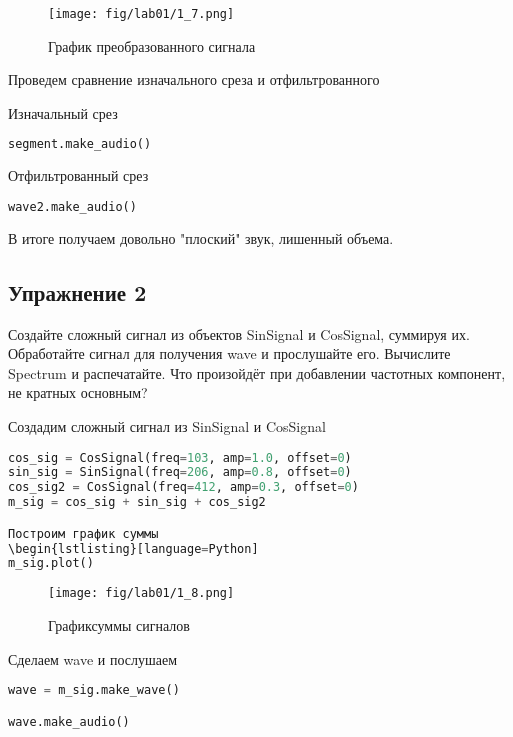 \begin{figure}[H]
	\begin{center}
		\texttt{[image: fig/lab01/1\_7.png]}
		\caption{График преобразованного сигнала}
	\end{center}
\end{figure}

Проведем сравнение изначального среза и отфильтрованного

Изначальный срез
\begin{lstlisting}[language=Python]
segment.make_audio()
\end{lstlisting}

Отфильтрованный срез
\begin{lstlisting}[language=Python]
wave2.make_audio()
\end{lstlisting}

В итоге получаем довольно "плоский" звук, лишенный объема.


\subsection{Упражнение 2}

Создайте сложный сигнал из объектов SinSignal и CosSignal, суммируя их. Обработайте сигнал для получения wave и прослушайте его. Вычислите Spectrum и распечатайте. Что произойдёт при добавлении частотных компонент, не кратных основным?

Создадим сложный сигнал из SinSignal и CosSignal
\begin{lstlisting}[language=Python]
cos_sig = CosSignal(freq=103, amp=1.0, offset=0)
sin_sig = SinSignal(freq=206, amp=0.8, offset=0)
cos_sig2 = CosSignal(freq=412, amp=0.3, offset=0)
m_sig = cos_sig + sin_sig + cos_sig2

Построим график суммы
\begin{lstlisting}[language=Python]
m_sig.plot()

\end{lstlisting}
\begin{figure}[H]
	\begin{center}
		\texttt{[image: fig/lab01/1\_8.png]}
		\caption{Графиксуммы сигналов}
	\end{center}
\end{figure}

Сделаем wave и послушаем
\begin{lstlisting}[language=Python]
wave = m_sig.make_wave()

wave.make_audio()
\end{lstlisting}

